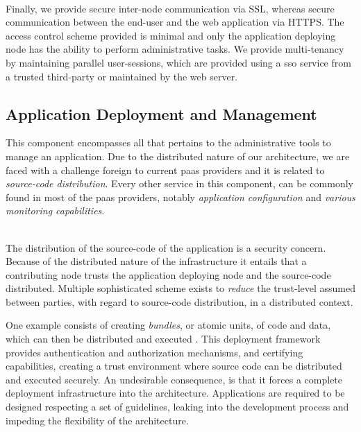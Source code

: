 \documentclass[12pt, titlepage]{uo_temp}
\begin{document}
     \\ 
     Finally, we provide secure inter-node communication via SSL, whereas secure
     communication between the end-user and the web application via HTTPS. The access
     control scheme provided is minimal and only the application deploying node has the
     ability to perform administrative tasks. We provide multi-tenancy by maintaining
     parallel user-sessions, which are provided using a \gls{sso} service from a trusted
     third-party or maintained by the web server.
     
     \subsection{Application Deployment and Management}
     This component encompasses all that pertains to the administrative tools to manage an
     application. Due to the distributed nature of our architecture, we are faced with a
     challenge foreign to current \gls{paas} providers and it is related to
     \emph{source-code distribution}. Every other service in this component, can be
     commonly found in most of the \gls{paas} providers, notably \emph{application
       configuration} and \emph{various monitoring capabilities}.

     \\ The distribution of the source-code of the application is a security concern.
     Because of the distributed nature of the infrastructure it entails that a
     contributing node trusts the application deploying node and the source-code
     distributed. Multiple sophisticated scheme exists to \emph{reduce} the trust-level
     assumed between parties, with regard to source-code distribution, in a distributed
     context.
     
     One example consists of creating \emph{bundles}, or atomic units, of code and data,
     which can then be distributed and executed \cite{dearle2004flexible}. This deployment
     framework provides authentication and authorization mechanisms, and certifying
     capabilities, creating a trust environment where source code can be distributed and
     executed securely. An undesirable consequence, is that it forces a complete
     deployment infrastructure into the architecture. Applications are required to be
     designed respecting a set of guidelines, leaking into the development process and
     impeding the flexibility of the architecture.
\end{document}
